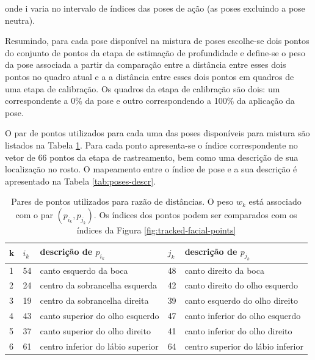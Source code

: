 onde i varia no intervalo de índices das poses de ação (as poses excluindo a pose neutra).

Resumindo, para cada pose disponível na mistura de poses escolhe-se dois pontos do conjunto de pontos da etapa de estimação de profundidade e define-se o peso da pose associada a partir da comparação entre a  distância entre esses dois pontos no quadro atual e a a distância entre esses dois pontos em quadros de uma etapa de calibração. Os quadros da etapa de calibração são dois: um correspondente a 0\% da pose e outro correspondendo a 100\% da aplicação da pose.

O par de pontos utilizados para cada uma das poses disponíveis para mistura são listados na Tabela \ref{tab:sensors}. Para cada ponto apresenta-se o índice correspondente no vetor de 66 pontos da etapa de rastreamento, bem como uma descrição de sua localização no rosto. O mapeamento entre o índice de pose e a sua descrição é apresentado na Tabela \ref{tab:poses-descr}. 

\begin{table}[!htb]
\centering
\begin{tabular}{|l|l|l|l|l|}
\hline
k &  $i_k$ & descrição de $p_{i_k}$ & $j_k$ & descrição de $p_{j_k}$ \\ \hline
1 &  54 & canto esquerdo da boca & 48  & canto direito da boca \\ \hline
2 & 24 & centro da sobrancelha esquerda & 42 & canto direito do olho esquerdo \\ \hline
3 & 19 & centro da sobrancelha direita & 39 & canto esquerdo do olho direito \\ 	\hline
4 &  43 & canto superior do olho esquerdo & 47 & canto inferior do olho esquerdo \\ \hline
5 &  37 & canto superior do olho direito & 41 & canto inferior do olho direito \\ \hline
6 &  61 & centro inferior do lábio superior& 64 & centro superior do lábio inferior \\ \hline
\end{tabular}
\caption{Pares de pontos utilizados para razão de distâncias. O peso $w_k$ está associado com o par $(p_{i_k},p_{j_k})$. Os índices dos pontos podem ser comparados com os índices da Figura \ref{fig:tracked-facial-points}}
\label{tab:sensors}
\end{table}

